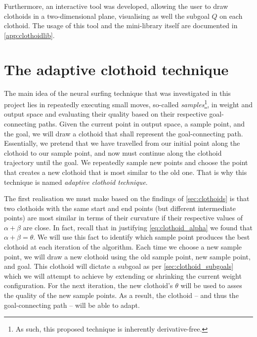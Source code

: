 Furthermore, an interactive tool was developed, allowing the user to draw clothoids in a two-dimensional plane, visualising as well the subgoal $Q$ on each clothoid. 
The usage of this tool and the mini-library itself are documented in \ref{app:clothoidlib}.

\section{The adaptive clothoid technique}
The main idea of the neural surfing technique that was investigated in this project lies in repeatedly executing small moves, so-called \textit{samples}\footnote{As such, this proposed technique is inherently derivative-free.}, in weight and output space and evaluating their quality based on their respective goal-connecting paths.
Given the current point in output space, a sample point, and the goal, we will draw a clothoid that shall represent the goal-connecting path.
Essentially, we pretend that we have travelled from our initial point along the clothoid to our sample point, and now must continue along the clothoid trajectory until the goal.
We repeatedly sample new points and choose the point that creates a new clothoid that is most similar to the old one.
That is why this technique is named \textit{adaptive clothoid technique}.

The first realisation we must make based on the findings of \ref{sec:clothoids} is that two clothoids with the same start and end points (but different intermediate points) are most similar in terms of their curvature if their respective values of $\alpha+\beta$ are close.
In fact, recall that in justifying \ref{eq:clothoid_alpha} we found that $\alpha+\beta=\theta$.
We will use this fact to identify which sample point produces the best clothoid at each iteration of the algorithm.
Each time we choose a new sample point, we will draw a new clothoid using the old sample point, new sample point, and goal.
This clothoid will dictate a subgoal as per \ref{sec:clothoid_subgoals} which we will attempt to achieve by extending or shrinking the current weight configuration.
For the next iteration, the new clothoid's $\theta$ will be used to asses the quality of the new sample points.
As a result, the clothoid -- and thus the goal-connecting path -- will be able to adapt.

